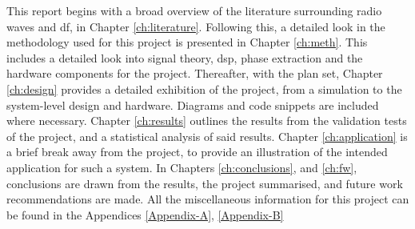 \documentclass[class=report,11pt,crop=false]{standalone}
\begin{document}
This report begins with a broad overview of the literature surrounding radio waves and \gls{df}, in Chapter \ref{ch:literature}. Following this, a detailed look in the methodology used for this project is presented in Chapter \ref{ch:meth}. This includes a detailed look into signal theory, \gls{dsp}, phase extraction and the hardware components for the project. Thereafter, with the plan set, Chapter \ref{ch:design} provides a detailed exhibition of the project, from a simulation to the system-level design and hardware. Diagrams and code snippets are included where necessary. Chapter \ref{ch:results} outlines the results from the validation tests of the project, and a statistical analysis of said results. Chapter \ref{ch:application} is a brief break away from the project, to provide an illustration of the intended application for such a system. In Chapters \ref{ch:conclusions}, and \ref{ch:fw}, conclusions are drawn from the results, the project summarised, and future work recommendations are made. All the miscellaneous information for this project can be found in the Appendices \ref{Appendix-A}, \ref{Appendix-B}


\ifstandalone

\printnoidxglossary[type=\acronymtype,nonumberlist]
\fi
\end{document}
